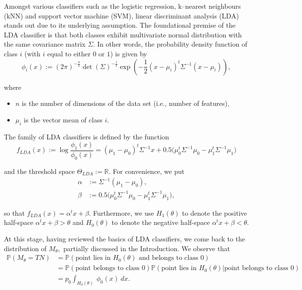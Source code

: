 \documentclass[10pt]{article}
\newcommand{\reals}{\mathbb{R}}
\newcommand{\Prob}{\mathbb{P}}
\begin{document}
Amongst various classifiers such as the logistic regression, k--nearest neighbours (kNN) and support vector machine (SVM), linear discriminant analysis (LDA) stands out due to its underlying assumption. The foundational premise of the LDA classifier is that both classes exhibit multivariate normal distribution with the same covariance matrix $\Sigma.$ In other words, the probability density function of class $i$ (with $i$ equal to either $0$ or $1$) is given by
$$\phi_i(x) := (2\pi)^{-\frac{n}{2}} \det(\Sigma)^{-\frac{1}{2}} \exp\left( - \frac{1}{2} (x-\mu_i)^t \Sigma^{-1} (x-\mu_i)\right),$$

\noindent
where
\begin{itemize}
	\item $n$ is the number of dimensions of the data set (i.e., number of features), 
	\item $\mu_i$ is the vector mean of class $i.$
\end{itemize}

\noindent
The family of LDA classifiers is defined by the function 
$$f_{LDA}(x) := \log \frac{\phi_1(x)}{\phi_0(x)} = (\mu_1-\mu_0)^t\Sigma^{-1}x + 0.5\bigg(\mu_0^t\Sigma^{-1}\mu_0 - \mu_1^t\Sigma^{-1}\mu_1\bigg)$$ 

\noindent
and the threshold space $\Theta_{LDA} := \reals.$ For convenience, we put 
\begin{equation}
\begin{split}
\alpha &:= \Sigma^{-1}(\mu_1 - \mu_0),\\
\beta &:= 0.5\bigg(\mu_0^t\Sigma^{-1}\mu_0 - \mu_1^t\Sigma^{-1}\mu_1\bigg),
\end{split}
\label{alphaandbeta}
\end{equation}

\noindent
so that $f_{LDA}(x) = \alpha^t x + \beta.$ Furthermore, we use $H_1(\theta)$ to denote the positive half-space $\alpha^t x + \beta > \theta$ and $H_0(\theta)$ to denote the negative half-space $\alpha^t x + \beta < \theta$. 

At this stage, having reviewed the basics of LDA classifiers, we come back to the distribution of $M_{\theta},$ partially discussed in the Introduction. We observe that 
\begin{equation*}
\begin{split}
\Prob(M_{\theta} = TN) &= \Prob(\text{point lies in } H_0(\theta) \text{ and belongs to class } 0) \\
&= \Prob(\text{point belongs to class } 0) \Prob(\text{point lies in } H_0(\theta) | \text{point belongs to class } 0) \\
&= p_0 \int_{H_0(\theta)}\ \phi_0(x)\ dx.
\end{split}
\end{equation*}
\end{document}
